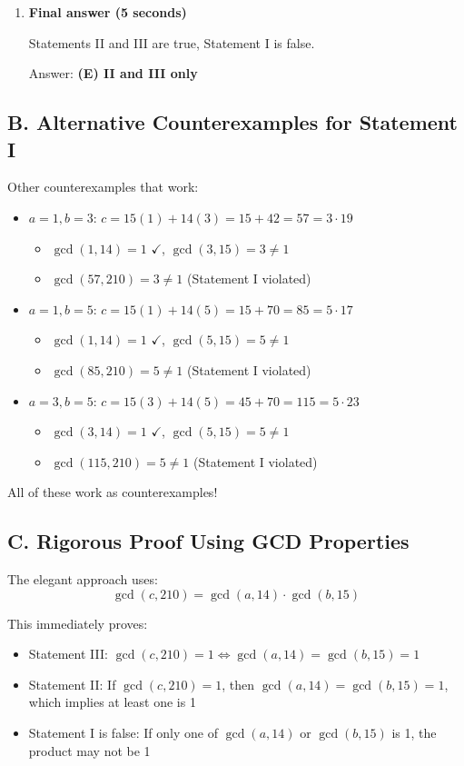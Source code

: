 \documentclass[12pt]{article}
\begin{document}
\begin{solutionbox}
\begin{enumerate}[leftmargin=*]
    \item \textbf{Final answer (5 seconds)}
    
    Statements II and III are true, Statement I is false.
    
    Answer: \textbf{(E) II and III only}
\end{enumerate}

\subsection*{B. Alternative Counterexamples for Statement I}

Other counterexamples that work:
\begin{itemize}
    \item $a=1, b=3$: $c = 15(1) + 14(3) = 15+42 = 57 = 3 \cdot 19$
    \begin{itemize}
        \item $\gcd(1,14)=1$ $\checkmark$, $\gcd(3,15)=3 \neq 1$
        \item $\gcd(57, 210) = 3 \neq 1$ (Statement I violated)
    \end{itemize}
    
    \item $a=1, b=5$: $c = 15(1) + 14(5) = 15+70 = 85 = 5 \cdot 17$
    \begin{itemize}
        \item $\gcd(1,14)=1$ $\checkmark$, $\gcd(5,15)=5 \neq 1$
        \item $\gcd(85, 210) = 5 \neq 1$ (Statement I violated)
    \end{itemize}
    
    \item $a=3, b=5$: $c = 15(3) + 14(5) = 45+70 = 115 = 5 \cdot 23$
    \begin{itemize}
        \item $\gcd(3,14)=1$ $\checkmark$, $\gcd(5,15)=5 \neq 1$
        \item $\gcd(115, 210) = 5 \neq 1$ (Statement I violated)
    \end{itemize}
\end{itemize}

All of these work as counterexamples!

\subsection*{C. Rigorous Proof Using GCD Properties}

The elegant approach uses:
$$\gcd(c,210) = \gcd(a,14) \cdot \gcd(b,15)$$

This immediately proves:
\begin{itemize}
    \item Statement III: $\gcd(c,210)=1 \Leftrightarrow \gcd(a,14)=\gcd(b,15)=1$
    \item Statement II: If $\gcd(c,210)=1$, then $\gcd(a,14)=\gcd(b,15)=1$, which implies at least one is 1
    \item Statement I is false: If only one of $\gcd(a,14)$ or $\gcd(b,15)$ is 1, the product may not be 1
\end{itemize}
\end{solutionbox}
\end{document}
